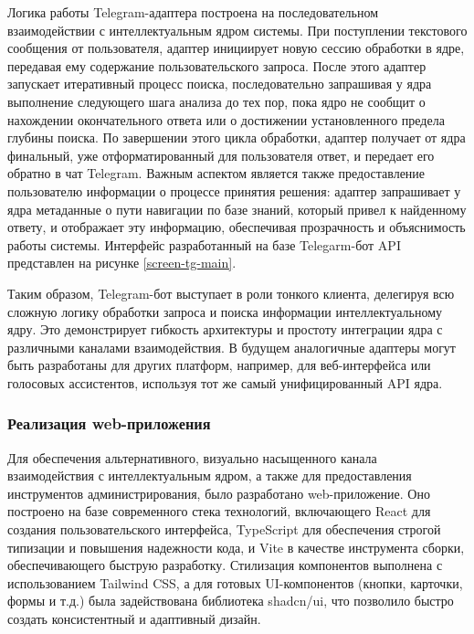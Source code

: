 
Логика работы Telegram-адаптера построена на последовательном взаимодействии с интеллектуальным ядром системы. При поступлении текстового сообщения от пользователя, адаптер инициирует новую сессию обработки в ядре, передавая ему содержание пользовательского запроса. После этого адаптер запускает итеративный процесс поиска, последовательно запрашивая у ядра выполнение следующего шага анализа до тех пор, пока ядро не сообщит о нахождении окончательного ответа или о достижении установленного предела глубины поиска. По завершении этого цикла обработки, адаптер получает от ядра финальный, уже отформатированный для пользователя ответ, и передает его обратно в чат Telegram. Важным аспектом является также предоставление пользователю информации о процессе принятия решения: адаптер запрашивает у ядра метаданные о пути навигации по базе знаний, который привел к найденному ответу, и отображает эту информацию, обеспечивая прозрачность и объяснимость работы системы. Интерфейс разработанный на базе Telegarm-бот API представлен на рисунке \ref{screen-tg-main}.

Таким образом, Telegram-бот выступает в роли тонкого клиента, делегируя всю сложную логику обработки запроса и поиска информации интеллектуальному ядру. Это демонстрирует гибкость архитектуры и простоту интеграции ядра с различными каналами взаимодействия. В будущем аналогичные адаптеры могут быть разработаны для других платформ, например, для веб-интерфейса или голосовых ассистентов, используя тот же самый унифицированный API ядра.

\subsubsection{Реализация web-приложения}

Для обеспечения альтернативного, визуально насыщенного канала взаимодействия с интеллектуальным ядром, а также для предоставления инструментов администрирования, было разработано web-приложение. Оно построено на базе современного стека технологий, включающего React для создания пользовательского интерфейса, TypeScript для обеспечения строгой типизации и повышения надежности кода, и Vite в качестве инструмента сборки, обеспечивающего быструю разработку. Стилизация компонентов выполнена с использованием Tailwind CSS, а для готовых UI-компонентов (кнопки, карточки, формы и т.д.) была задействована библиотека shadcn/ui, что позволило быстро создать консистентный и адаптивный дизайн.

